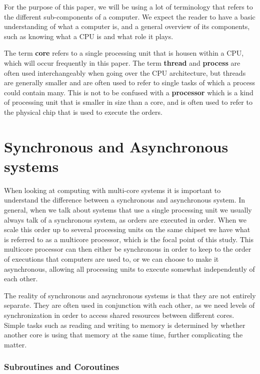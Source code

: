 \documentclass{article}
\begin{document}
For the purpose of this paper, we will be using a lot of terminology that refers to the different sub-components of a computer. We expect the reader to have a basic understanding of what a computer is, and a general overview of its components, such as knowing what a CPU is and what role it plays. 

The term \textbf{core} refers to a single processing unit that is housen within a CPU, which will occur frequently in this paper. The term \textbf{thread} and \textbf{process} are often used interchangeably when going over the CPU architecture, but threads are generally smaller and are often used to refer to single tasks of which a process could contain many. This is not to be confused with a \textbf{processor} which is a kind of processing unit that is smaller in size than a core, and is often used to refer to the physical chip that is used to execute the orders.

\section{Synchronous and Asynchronous systems}

When looking at computing with multi-core systems it is important to understand the difference between a synchronous and asynchronous system. In general, when we talk about systems that use a single processing unit we usually always talk of a synchronous system, as orders are executed in order. When we scale this order up to several processing units on the same chipset we have what is referred to as a multicore processor, which is the focal point of this study. This multicore processor can then either be synchronous in order to keep to the order of executions that computers are used to, or we can choose to make it asynchronous, allowing all processing units to execute somewhat independently of each other. 

The reality of synchronous and asynchronous systems is that they are not entirely separate. They are often used in conjunction with each other, as we need levels of synchronization in order to access shared resources between different cores. Simple tasks such as reading and writing to memory is determined by whether another core is using that memory at the same time, further complicating the matter.

\subsubsection{Subroutines and Coroutines}
\end{document}

